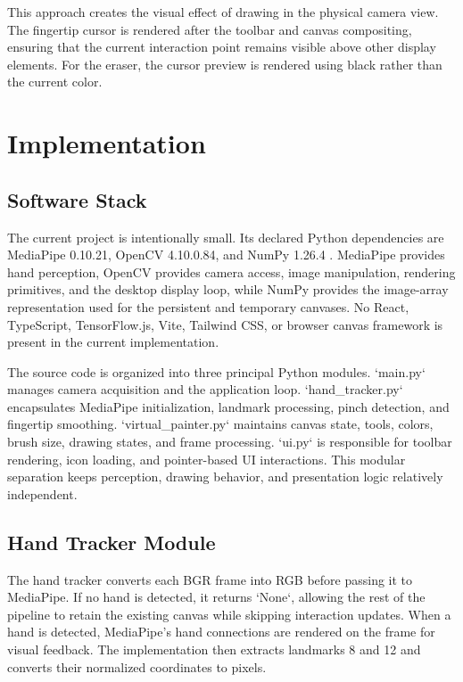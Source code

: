 \documentclass[conference]{IEEEtran}
\begin{document}
This approach creates the visual effect of drawing in the physical camera view. The fingertip cursor is rendered after the toolbar and canvas compositing, ensuring that the current interaction point remains visible above other display elements. For the eraser, the cursor preview is rendered using black rather than the current color.

\section{Implementation}

\subsection{Software Stack}
The current project is intentionally small. Its declared Python dependencies are MediaPipe 0.10.21, OpenCV 4.10.0.84, and NumPy 1.26.4 \cite{repo}. MediaPipe provides hand perception, OpenCV provides camera access, image manipulation, rendering primitives, and the desktop display loop, while NumPy provides the image-array representation used for the persistent and temporary canvases. No React, TypeScript, TensorFlow.js, Vite, Tailwind CSS, or browser canvas framework is present in the current implementation.

The source code is organized into three principal Python modules. `main.py` manages camera acquisition and the application loop. `hand\_tracker.py` encapsulates MediaPipe initialization, landmark processing, pinch detection, and fingertip smoothing. `virtual\_painter.py` maintains canvas state, tools, colors, brush size, drawing states, and frame processing. `ui.py` is responsible for toolbar rendering, icon loading, and pointer-based UI interactions. This modular separation keeps perception, drawing behavior, and presentation logic relatively independent.

\subsection{Hand Tracker Module}
The hand tracker converts each BGR frame into RGB before passing it to MediaPipe. If no hand is detected, it returns `None`, allowing the rest of the pipeline to retain the existing canvas while skipping interaction updates. When a hand is detected, MediaPipe's hand connections are rendered on the frame for visual feedback. The implementation then extracts landmarks 8 and 12 and converts their normalized coordinates to pixels.
\end{document}
